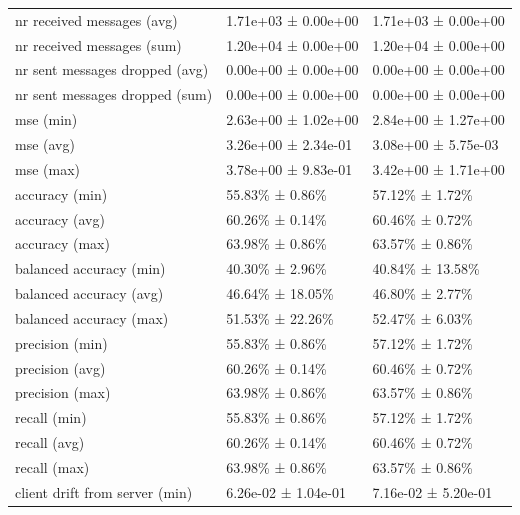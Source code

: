 \begin{tabular}{lll}
 nr received messages (avg)         & 1.71e+03 ± 0.00e+00 & 1.71e+03 ± 0.00e+00         \\
 nr received messages (sum)         & 1.20e+04 ± 0.00e+00 & 1.20e+04 ± 0.00e+00         \\
 nr sent messages dropped (avg)     & 0.00e+00 ± 0.00e+00 & 0.00e+00 ± 0.00e+00         \\
 nr sent messages dropped (sum)     & 0.00e+00 ± 0.00e+00 & 0.00e+00 ± 0.00e+00         \\
 mse (min)                          & 2.63e+00 ± 1.02e+00 & 2.84e+00 ± 1.27e+00         \\
 mse (avg)                          & 3.26e+00 ± 2.34e-01 & 3.08e+00 ± 5.75e-03         \\
 mse (max)                          & 3.78e+00 ± 9.83e-01 & 3.42e+00 ± 1.71e+00         \\
 accuracy (min)                     & 55.83\% ± 0.86\%      & 57.12\% ± 1.72\%              \\
 accuracy (avg)                     & 60.26\% ± 0.14\%      & 60.46\% ± 0.72\%              \\
 accuracy (max)                     & 63.98\% ± 0.86\%      & 63.57\% ± 0.86\%              \\
 balanced accuracy (min)            & 40.30\% ± 2.96\%      & 40.84\% ± 13.58\%             \\
 balanced accuracy (avg)            & 46.64\% ± 18.05\%     & 46.80\% ± 2.77\%              \\
 balanced accuracy (max)            & 51.53\% ± 22.26\%     & 52.47\% ± 6.03\%              \\
 precision (min)                    & 55.83\% ± 0.86\%      & 57.12\% ± 1.72\%              \\
 precision (avg)                    & 60.26\% ± 0.14\%      & 60.46\% ± 0.72\%              \\
 precision (max)                    & 63.98\% ± 0.86\%      & 63.57\% ± 0.86\%              \\
 recall (min)                       & 55.83\% ± 0.86\%      & 57.12\% ± 1.72\%              \\
 recall (avg)                       & 60.26\% ± 0.14\%      & 60.46\% ± 0.72\%              \\
 recall (max)                       & 63.98\% ± 0.86\%      & 63.57\% ± 0.86\%              \\
 client drift from server (min)     & 6.26e-02 ± 1.04e-01 & 7.16e-02 ± 5.20e-01         \\

\end{tabular}
